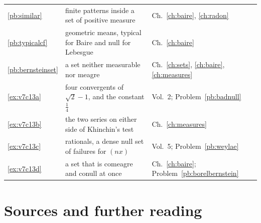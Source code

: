 \begin{center}
{\begin{tabular}{lll}
\ref{pb:similar} & finite patterns inside a set of positive measure & Ch.~\ref{ch:baire}, \ref{ch:radon}\\
\ref{pb:typicalcf} & geometric means, typical for Baire and null for Lebesgue & Ch.~\ref{ch:baire}\\
\ref{pb:bernsteinset} & a set neither measurable nor meagre & Ch.~\ref{ch:sets}, \ref{ch:baire}, \ref{ch:measures}\\
\ref{ex:v7c13a} & four convergents of $\sqrt2-1$, and the constant $\frac14$ & Vol.~2; Problem~\ref{pb:badnull}\\
\ref{ex:v7c13b} & the two series on either side of Khinchin's test & Ch.~\ref{ch:measures}\\
\ref{ex:v7c13c} & rationals, a dense null set of failures for $(nx)$ & Vol.~5; Problem~\ref{pb:weylae}\\
\ref{ex:v7c13d} & a set that is comeagre and conull at once & Ch.~\ref{ch:baire}; Problem~\ref{pb:borelbernstein}\\
\end{tabular}}
\end{center}

\section*{Sources and further reading}

